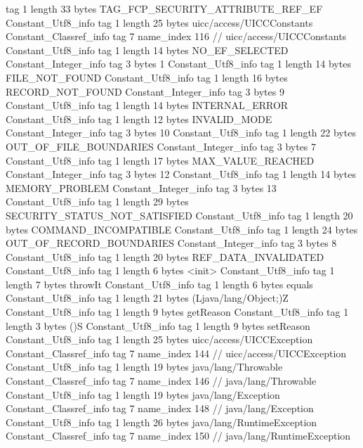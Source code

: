 {{{			tag	1
			length	33
			bytes	TAG_FCP_SECURITY_ATTRIBUTE_REF_EF
		}
		Constant_Utf8_info {
			tag	1
			length	25
			bytes	uicc/access/UICCConstants
		}
		Constant_Classref_info {
			tag	7
			name_index	116		// uicc/access/UICCConstants
		}
		Constant_Utf8_info {
			tag	1
			length	14
			bytes	NO_EF_SELECTED
		}
		Constant_Integer_info {
			tag	3
			bytes	1
		}
		Constant_Utf8_info {
			tag	1
			length	14
			bytes	FILE_NOT_FOUND
		}
		Constant_Utf8_info {
			tag	1
			length	16
			bytes	RECORD_NOT_FOUND
		}
		Constant_Integer_info {
			tag	3
			bytes	9
		}
		Constant_Utf8_info {
			tag	1
			length	14
			bytes	INTERNAL_ERROR
		}
		Constant_Utf8_info {
			tag	1
			length	12
			bytes	INVALID_MODE
		}
		Constant_Integer_info {
			tag	3
			bytes	10
		}
		Constant_Utf8_info {
			tag	1
			length	22
			bytes	OUT_OF_FILE_BOUNDARIES
		}
		Constant_Integer_info {
			tag	3
			bytes	7
		}
		Constant_Utf8_info {
			tag	1
			length	17
			bytes	MAX_VALUE_REACHED
		}
		Constant_Integer_info {
			tag	3
			bytes	12
		}
		Constant_Utf8_info {
			tag	1
			length	14
			bytes	MEMORY_PROBLEM
		}
		Constant_Integer_info {
			tag	3
			bytes	13
		}
		Constant_Utf8_info {
			tag	1
			length	29
			bytes	SECURITY_STATUS_NOT_SATISFIED
		}
		Constant_Utf8_info {
			tag	1
			length	20
			bytes	COMMAND_INCOMPATIBLE
		}
		Constant_Utf8_info {
			tag	1
			length	24
			bytes	OUT_OF_RECORD_BOUNDARIES
		}
		Constant_Integer_info {
			tag	3
			bytes	8
		}
		Constant_Utf8_info {
			tag	1
			length	20
			bytes	REF_DATA_INVALIDATED
		}
		Constant_Utf8_info {
			tag	1
			length	6
			bytes	<init>
		}
		Constant_Utf8_info {
			tag	1
			length	7
			bytes	throwIt
		}
		Constant_Utf8_info {
			tag	1
			length	6
			bytes	equals
		}
		Constant_Utf8_info {
			tag	1
			length	21
			bytes	(Ljava/lang/Object;)Z
		}
		Constant_Utf8_info {
			tag	1
			length	9
			bytes	getReason
		}
		Constant_Utf8_info {
			tag	1
			length	3
			bytes	()S
		}
		Constant_Utf8_info {
			tag	1
			length	9
			bytes	setReason
		}
		Constant_Utf8_info {
			tag	1
			length	25
			bytes	uicc/access/UICCException
		}
		Constant_Classref_info {
			tag	7
			name_index	144		// uicc/access/UICCException
		}
		Constant_Utf8_info {
			tag	1
			length	19
			bytes	java/lang/Throwable
		}
		Constant_Classref_info {
			tag	7
			name_index	146		// java/lang/Throwable
		}
		Constant_Utf8_info {
			tag	1
			length	19
			bytes	java/lang/Exception
		}
		Constant_Classref_info {
			tag	7
			name_index	148		// java/lang/Exception
		}
		Constant_Utf8_info {
			tag	1
			length	26
			bytes	java/lang/RuntimeException
		}
		Constant_Classref_info {
			tag	7
			name_index	150		// java/lang/RuntimeException
}}}
